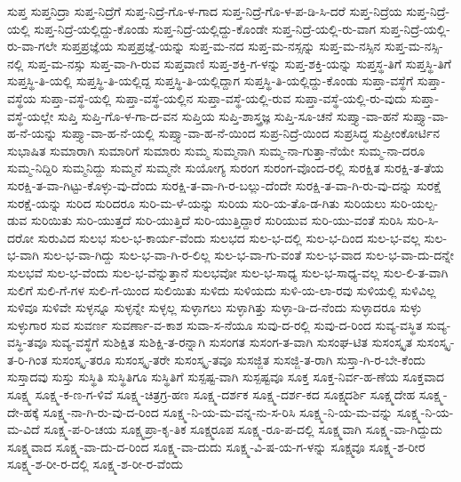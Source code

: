 {ಸುಪ್ತ
ಸುಪ್ತನಿದ್ರಾ
ಸುಪ್ತ-ನಿದ್ರೆಗೆ
ಸುಪ್ತ-ನಿದ್ರೆ-ಗೊ-ಳ-ಗಾದ
ಸುಪ್ತ-ನಿದ್ರೆ-ಗೊ-ಳ-ಪ-ಡಿ-ಸಿ-ದರೆ
ಸುಪ್ತ-ನಿದ್ರೆಯ
ಸುಪ್ತ-ನಿದ್ರೆ-ಯಲ್ಲಿ
ಸುಪ್ತ-ನಿದ್ರೆ-ಯಲ್ಲಿದ್ದು-ಕೊಂಡು
ಸುಪ್ತ-ನಿದ್ರೆ-ಯಲ್ಲಿದ್ದು-ಕೊಂಡೇ
ಸುಪ್ತ-ನಿದ್ರೆ-ಯಲ್ಲಿ-ರು-ವಾಗ
ಸುಪ್ತ-ನಿದ್ರೆ-ಯಲ್ಲಿ-ರು-ವಾ-ಗಲೇ
ಸುಪ್ತಪ್ರಜ್ಞೆಯ
ಸುಪ್ತಪ್ರಜ್ಞೆ-ಯನ್ನು
ಸುಪ್ತ-ಮ-ನದ
ಸುಪ್ತ-ಮ-ನಸ್ಸನ್ನು
ಸುಪ್ತ-ಮ-ನಸ್ಸಿನ
ಸುಪ್ತ-ಮ-ನಸ್ಸಿ-ನಲ್ಲಿ
ಸುಪ್ತ-ಮ-ನಸ್ಸು
ಸುಪ್ತ-ವಾ-ಗಿ-ರುವ
ಸುಪ್ತವಾಣಿ
ಸುಪ್ತ-ಶಕ್ತಿ-ಗ-ಳನ್ನು
ಸುಪ್ತ-ಶಕ್ತಿ-ಯನ್ನು
ಸುಪ್ತಸ್ಥ-ತಿಗೆ
ಸುಪ್ತಸ್ಥಿ-ತಿಗೆ
ಸುಪ್ತಸ್ಥಿ-ತಿ-ಯಲ್ಲಿ
ಸುಪ್ತಸ್ಥಿ-ತಿ-ಯಲ್ಲಿದ್ದ
ಸುಪ್ತಸ್ಥಿ-ತಿ-ಯಲ್ಲಿದ್ದಾಗ
ಸುಪ್ತಸ್ಥಿ-ತಿ-ಯಲ್ಲಿದ್ದು-ಕೊಂಡು
ಸುಪ್ತಾ-ವಸ್ಥೆಗೆ
ಸುಪ್ತಾ-ವಸ್ಥೆಯ
ಸುಪ್ತಾ-ವಸ್ಥೆ-ಯಲ್ಲಿ
ಸುಪ್ತಾ-ವಸ್ಥೆ-ಯಲ್ಲಿನ
ಸುಪ್ತಾ-ವಸ್ಥೆ-ಯಲ್ಲಿ-ರುವ
ಸುಪ್ತಾ-ವಸ್ಥೆ-ಯಲ್ಲಿ-ರು-ವುದು
ಸುಪ್ತಾ-ವಸ್ಥೆ-ಯಲ್ಲೇ
ಸುಪ್ತಿ
ಸುಪ್ತಿ-ಗೊ-ಳ-ಗಾ-ದ-ವನ
ಸುಪ್ತಿಯ
ಸುಪ್ತಿ-ಶಾಸ್ತ್ರಜ್ಞ
ಸುಪ್ತಿ-ಸೂ-ಚನೆ
ಸುಪ್ತ್ಯಾ-ವಾ-ಹನೆ
ಸುಪ್ತ್ಯಾ-ವಾ-ಹ-ನೆ-ಯನ್ನು
ಸುಪ್ತ್ಯಾ-ವಾ-ಹ-ನೆ-ಯಲ್ಲಿ
ಸುಪ್ತ್ಯಾ-ವಾ-ಹ-ನೆ-ಯಿಂದ
ಸುಪ್ರ-ನಿದ್ರೆ-ಯಿಂದ
ಸುಪ್ರಸಿದ್ಧ
ಸುಪ್ರೀಂಕೋರ್ಟಿನ
ಸುಭಾಷಿತ
ಸುಮಾರಾಗಿ
ಸುಮಾರಿಗೆ
ಸುಮಾರು
ಸುಮ್ಮ
ಸುಮ್ಮನಾಗಿ
ಸುಮ್ಮ-ನಾ-ಗುತ್ತಾ-ನೆಯೇ
ಸುಮ್ಮ-ನಾ-ದರೂ
ಸುಮ್ಮ-ನಿದ್ದಿರಿ
ಸುಮ್ಮನಿದ್ದು
ಸುಮ್ಮನೆ
ಸುಮ್ಮನೇ
ಸುಯೋಗ್ಯ
ಸುರಂಗ
ಸುರಂಗ-ವೊಂದ-ರಲ್ಲಿ
ಸುರಕ್ಷಿತ
ಸುರಕ್ಷಿ-ತ-ತೆಯ
ಸುರಕ್ಷಿ-ತ-ವಾ-ಗಿಟ್ಟು-ಕೊಳ್ಳು-ವು-ದೆಂದು
ಸುರಕ್ಷಿ-ತ-ವಾ-ಗಿ-ರ-ಬಲ್ಲು-ದೆಂದೇ
ಸುರಕ್ಷಿ-ತ-ವಾ-ಗಿ-ರು-ವು-ದನ್ನು
ಸುರಕ್ಷೆ
ಸುರಕ್ಷೆ-ಯನ್ನು
ಸುರಿದ
ಸುರಿದರೂ
ಸುರಿ-ಮ-ಳೆ-ಯನ್ನು
ಸುರಿಯ
ಸುರಿ-ಯ-ತೊ-ಡ-ಗಿತು
ಸುರಿಯಲು
ಸುರಿ-ಯಲ್ಪ-ಡುವ
ಸುರಿಯಿತು
ಸುರಿ-ಯುತ್ತದೆ
ಸುರಿ-ಯುತ್ತಿದೆ
ಸುರಿ-ಯುತ್ತಿದ್ದಾರೆ
ಸುರಿಯುವ
ಸುರಿ-ಯು-ವಂತೆ
ಸುರಿಸಿ
ಸುರಿ-ಸಿ-ದರೋ
ಸುರುವಿದ
ಸುಲಭ
ಸುಲ-ಭ-ಕಾರ್ಯ-ವೆಂದು
ಸುಲಭದ
ಸುಲ-ಭ-ದಲ್ಲಿ
ಸುಲ-ಭ-ದಿಂದ
ಸುಲ-ಭ-ವಲ್ಲ
ಸುಲ-ಭ-ವಾಗಿ
ಸುಲ-ಭ-ವಾ-ಗಿದ್ದು
ಸುಲ-ಭ-ವಾ-ಗಿ-ರ-ಲಿಲ್ಲ
ಸುಲ-ಭ-ವಾ-ಗು-ವಂತೆ
ಸುಲ-ಭ-ವಾದ
ಸುಲ-ಭ-ವಾ-ದು-ದನ್ನೇ
ಸುಲಭವೆ
ಸುಲ-ಭ-ವೆಂದು
ಸುಲ-ಭ-ವೆನ್ನುತ್ತಾನೆ
ಸುಲಭವೋ
ಸುಲ-ಭ-ಸಾಧ್ಯ
ಸುಲ-ಭ-ಸಾಧ್ಯ-ವಲ್ಲ
ಸುಲ-ಲಿ-ತ-ವಾಗಿ
ಸುಲಿಗೆ
ಸುಲಿ-ಗೆ-ಗಳ
ಸುಲಿ-ಗೆ-ಯಿಂದ
ಸುಲಿಯಿತು
ಸುಳಿದು
ಸುಳಿಯದು
ಸುಳಿ-ಯ-ಲಾ-ರವು
ಸುಳಿಯಲ್ಲಿ
ಸುಳಿವಿಲ್ಲ
ಸುಳಿವೂ
ಸುಳಿವೇ
ಸುಳ್ಳನ್ನೂ
ಸುಳ್ಳನ್ನೇ
ಸುಳ್ಳಲ್ಲ
ಸುಳ್ಳಾಗಲು
ಸುಳ್ಳಾಗಿತ್ತು
ಸುಳ್ಳಾ-ಡಿ-ದ-ನೆಂದು
ಸುಳ್ಳಾದರೂ
ಸುಳ್ಳು
ಸುಳ್ಳುಗಾರ
ಸುವ
ಸುವರ್ಣ
ಸುವರ್ಣಾ-ವ-ಕಾಶ
ಸುವಾ-ಸ-ನೆಯೂ
ಸುವು-ದ-ರಲ್ಲಿ
ಸುವು-ದ-ರಿಂದ
ಸುವ್ಯ-ವಸ್ಥಿತ
ಸುವ್ಯ-ವಸ್ಥಿ-ತವೂ
ಸುವ್ಯ-ವಸ್ಥೆಗೆ
ಸುಶಿಕ್ಷಿತ
ಸುಶಿಕ್ಷಿ-ತ-ರನ್ನಾಗಿ
ಸುಸಂಗತ
ಸುಸಂಗ-ತ-ವಾಗಿ
ಸುಸಂಘ-ಟಿತ
ಸುಸಂಸ್ಕೃತ
ಸುಸಂಸ್ಕೃ-ತ-ರಿ-ಗಿಂತ
ಸುಸಂಸ್ಕೃ-ತರೂ
ಸುಸಂಸ್ಕೃ-ತರೇ
ಸುಸಂಸ್ಕೃ-ತವೂ
ಸುಸಜ್ಜಿತ
ಸುಸಜ್ಜಿ-ತ-ರಾಗಿ
ಸುಸ್ತಾ-ಗಿ-ರ-ಬೇ-ಕೆಂದು
ಸುಸ್ತಾದವು
ಸುಸ್ತು
ಸುಸ್ಥಿತಿ
ಸುಸ್ಥಿತಿಗೂ
ಸುಸ್ಥಿತಿಗೆ
ಸುಸ್ಪಷ್ಟ-ವಾಗಿ
ಸುಸ್ಪಷ್ಟವೂ
ಸೂಕ್ತ
ಸೂಕ್ತ-ನಿರ್ವ-ಹ-ಣೆಯ
ಸೂಕ್ತವಾದ
ಸೂಕ್ಷ್ಮ
ಸೂಕ್ಷ್ಮ-ಕ-ಣ-ಗ-ಳಿವೆ
ಸೂಕ್ಷ್ಮ-ಚಿತ್ರಗ್ರ-ಹಣ
ಸೂಕ್ಷ್ಮ-ದರ್ಶಕ
ಸೂಕ್ಷ್ಮ-ದರ್ಶ-ಕದ
ಸೂಕ್ಷ್ಮದರ್ಶಿ
ಸೂಕ್ಷ್ಮದೇಹ
ಸೂಕ್ಷ್ಮ-ದೇ-ಹಕ್ಕೆ
ಸೂಕ್ಷ್ಮ-ನಾ-ಗಿ-ರು-ವು-ದ-ರಿಂದ
ಸೂಕ್ಷ್ಮ-ನಿ-ಯ-ಮ-ವನ್ನ-ನು-ಸ-ರಿಸಿ
ಸೂಕ್ಷ್ಮ-ನಿ-ಯ-ಮ-ವನ್ನು
ಸೂಕ್ಷ್ಮ-ನಿ-ಯ-ಮ-ವಿದೆ
ಸೂಕ್ಷ್ಮ-ಪ-ರಿ-ಚಯ
ಸೂಕ್ಷ್ಮಪ್ರಾ-ಕೃ-ತಿಕ
ಸೂಕ್ಷ್ಮರೂಪ
ಸೂಕ್ಷ್ಮ-ರೂ-ಪ-ದಲ್ಲಿ
ಸೂಕ್ಷ್ಮವಾಗಿ
ಸೂಕ್ಷ್ಮ-ವಾ-ಗಿದ್ದುದು
ಸೂಕ್ಷ್ಮವಾದ
ಸೂಕ್ಷ್ಮ-ವಾ-ದು-ದ-ರಿಂದ
ಸೂಕ್ಷ್ಮ-ವಾ-ದುದು
ಸೂಕ್ಷ್ಮ-ವಿ-ಷ-ಯ-ಗ-ಳನ್ನು
ಸೂಕ್ಷ್ಮವೂ
ಸೂಕ್ಷ್ಮ-ಶ-ರೀರ
ಸೂಕ್ಷ್ಮ-ಶ-ರೀ-ರ-ದಲ್ಲಿ
ಸೂಕ್ಷ್ಮ-ಶ-ರೀ-ರ-ವೆಂದು
}
